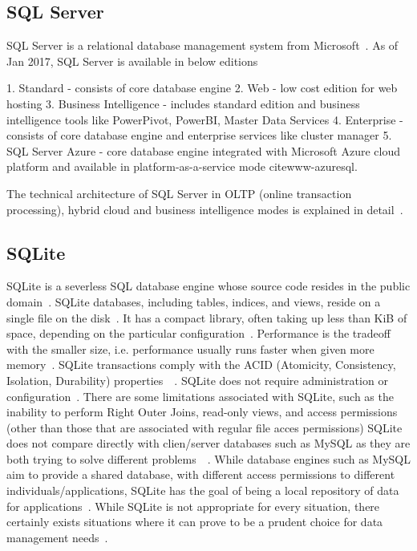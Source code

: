 \subsection{SQL Server}

SQL Server is a relational database management system from
Microsoft~\cite{www-sqlserver-wiki}.  As of Jan 2017, SQL Server is
available in below editions

     1. Standard - consists of core database engine
     2. Web - low cost edition for web hosting
     3. Business Intelligence - includes standard edition and business
        intelligence tools like PowerPivot, PowerBI, Master Data Services
     4. Enterprise - consists of core database engine and enterprise services
        like cluster manager
     5. SQL Server Azure - core database engine
        integrated with Microsoft Azure cloud platform and available in
        platform-as-a-service mode cite{www-azuresql}.

        The technical architecture of SQL Server in OLTP (online
        transaction processing), hybrid cloud and business
        intelligence modes is explained in
        detail~\cite{book-sqlserver}.

     \pv



\subsection{SQLite}

SQLite is a severless SQL database engine whose source code resides in
the public domain~\cite{sqliteabout}. SQLite databases, including
tables, indices, and views, reside on a single file on the
disk~\cite{sqliteabout}. It has a compact library, often taking up
less than KiB of space, depending on the particular
configuration~\cite{sqliteabout}. Performance is the tradeoff with the
smaller size, i.e. performance usually runs faster when given more
memory~\cite{sqliteabout}. SQLite transactions comply with the ACID
(Atomicity, Consistency, Isolation, Durability)
properties~\cite{sqliteabout}~\cite{acid}. SQLite does not require
administration or configuration~\cite{sqliteover}. There are some
limitations associated with SQLite, such as the inability to perform
Right Outer Joins, read-only views, and access permissions (other than
those that are associated with regular file acces permissions) SQLite
does not compare directly with clien/server databases such as MySQL as
they are both trying to solve different
problems~\cite{sqlitewhentouse}~\cite{sqliteover}.  While database
engines such as MySQL aim to provide a shared database, with different
access permissions to different individuals/applications, SQLite has
the goal of being a local repository of data for
applications~\cite{sqlitewhentouse}. While SQLite is not appropriate
for every situation, there certainly exists situations where it can
prove to be a prudent choice for data management
needs~\cite{sqlitewhentouse}.


